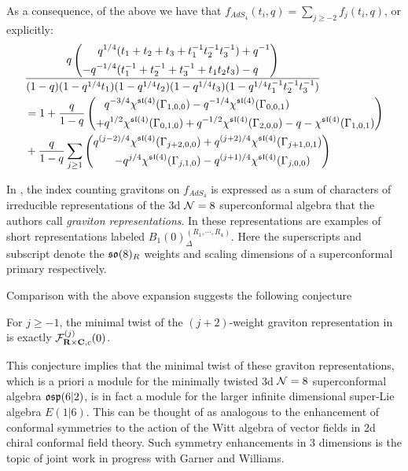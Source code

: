 \documentclass[../main.tex]{subfiles}
\begin{document}
\parsec[]
As a consequence, of the above we have that $f_{AdS_4} (t_i, q) = \sum_{j\geq -2} f_j (t_i, q)$, or explicitly:
\begin{align*}
& \frac{q\left (\begin{aligned} q^{1/4}(t_1+ t_2 + t_3+t_1^{-1}t_2^{-1}t_3^{-1}) &+ q^{-1} \\- q^{-1/4}(t_1^{-1}+ t_2^{-1} + t_3^{-1}+t_1t_2t_3) &- q   \end{aligned}\right)}{(1-q)(1-q^{1/4}t_1)(1-q^{1/4}t_2)(1-q^{1/4}t_3)(1-q^{1/4}t_1^{-1}t_2^{-1}t_3^{-1})}  \\ 
& =  1 + \frac{q}{1-q} \left (\begin{aligned} & q^{-3/4}\chi^{\mathfrak{sl}(4)}(\Gamma_{1,0,0}) - q^{-1/4}\chi^{\mathfrak{sl}(4)}(\Gamma_{0,0,1}) \\+ & q^{1/2}\chi^{\mathfrak{sl}(4)}(\Gamma_{0,1,0})  + q^{-1/2}\chi^{\mathfrak{sl}(4)}(\Gamma_{2,0,0})  - q - \chi^{\mathfrak{sl}(4)}(\Gamma_{1,0,1}) \end{aligned}\right ) \\
& + \frac{q}{1-q} \sum_{j\geq 1} \left (\begin{aligned} q^{(j-2)/4}\chi^{\mathfrak{sl}(4)}(\Gamma_{j+2,0,0})  &+ q^{(j+2)/4}\chi^{\mathfrak{sl}(4)}(\Gamma_{j+1,0,1}) \\ - q^{j/4}\chi^{\mathfrak{sl}(4)}(\Gamma_{j,1,0}) & - q^{(j+1)/4}\chi^{\mathfrak{sl}(4)}(\Gamma_{j,0,0}) \end{aligned}\right ) 
\end{align*}

In \cite[Eq. (2.15, 2.16)]{Bhattacharya:2008zy}, the index counting gravitons on $f_{AdS_4}$ is expressed as a sum of characters of irreducible representations of the 3d $\mathcal{N} = 8$ superconformal algebra that the authors call \textit{graviton representations}. In \cite[Table 9]{cordova2016multiplets} these representations are examples of short representations labeled $B_1(0)_{\Delta}^{(R_1,\cdots, R_4)}$. Here the superscripts and subscript denote the $\mathfrak{so}(8)_R$ weights and scaling dimensions of a superconformal primary respectively. 


Comparison with the above expansion suggests the following conjecture

\begin{conj}\label{conj:e16gravitonrep}
For $j\geq -1$, the minimal twist of the $(j+2)$-weight graviton representation in \cite[Eq. (2.15, 2.16)]{Bhattacharya:2008zy} is exactly $\mathcal{F}^{(j)}_{\mathbf{R}\times \mathbf{C}, c}(0)$. 
\end{conj}

\begin{rmk}\label{rmk:e16enhance}
This conjecture implies that the minimal twist of these graviton representations, which is a priori a module for the minimally twisted 3d $\mathcal{N}=8$ superconformal algebra $\mathfrak{osp}(6|2)$, is in fact a module for the larger infinite dimensional super-Lie algebra $E(1|6)$. This can be thought of as analogous to the enhancement of conformal symmetries to the action of the Witt algebra of vector fields in 2d chiral conformal field theory. Such symmetry enhancements in 3 dimensions is the topic of joint work in progress with Garner and Williams.
\end{rmk}
\end{document}
